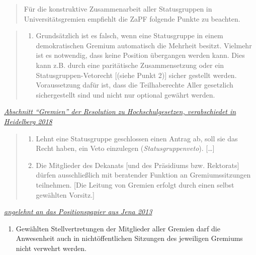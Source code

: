 \begin{quote}
Für die konstruktive Zusammenarbeit aller Statusgruppen in
Universitätsgremien empfiehlt die ZaPF folgende Punkte zu beachten.
\end{quote}

\begin{quote}
\begin{enumerate}
\def\labelenumi{\arabic{enumi}.}
\tightlist
\item
  Grundsätzlich ist es falsch, wenn eine Statusgruppe in einem
  demokratischen Gremium automatisch die Mehrheit besitzt. Vielmehr ist
  es notwendig, dass keine Position übergangen werden kann. Dies kann
  z.B. durch eine paritätische Zusammensetzung oder ein
  Statusgruppen-Vetorecht {[}(siehe Punkt 2){]} sicher gestellt werden.
  Voraussetzung dafür ist, dass die Teilhaberechte Aller gesetzlich
  sichergestellt sind und nicht nur optional gewährt werden.
\end{enumerate}
\end{quote}

\href{https://zapfev.de/resolutionen/sose18/Hochschulgesetze/reso_hsgesetze.pdf}{\emph{Abschnitt
``Gremien'' der Resolution zu Hochschulgesetzen, verabschiedet in
Heidelberg 2018}}

\begin{quote}
\begin{enumerate}
\def\labelenumi{\arabic{enumi}.}
\setcounter{enumi}{1}
\tightlist
\item
  Lehnt eine Statusgruppe geschlossen einen Antrag ab, soll sie das
  Recht haben, ein Veto einzulegen (\emph{Statusgruppenveto}).
  {[}\ldots{}{]}
\item
  Die Mitglieder des Dekanats {[}und des Präsidiums bzw. Rektorats{]}
  dürfen ausschließlich mit beratender Funktion an Gremiumssitzungen
  teilnehmen. {[}Die Leitung von Gremien erfolgt durch einen selbst
  gewählten Vorsitz.{]}
\end{enumerate}
\end{quote}

\href{https://zapf.wiki/Sammlung_aller_Resolutionen_und_Positionspapiere\#Positionspapier_zur_demokratischen_Mitgestaltung_in_Hochschulgremien}{\emph{angelehnt
an das Positionspapier aus Jena 2013}}

\begin{enumerate}
\def\labelenumi{\arabic{enumi}.}
\setcounter{enumi}{3}
\tightlist
\item
  Gewählten Stellvertretungen der Mitglieder aller Gremien darf die
  Anwesenheit auch in nichtöffentlichen Sitzungen des jeweiligen
  Gremiums nicht verwehrt werden.
\end{enumerate}

